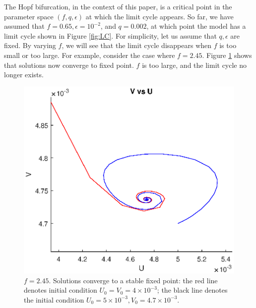 \documentclass[twocolumn,amsmath,amssymb,aps]{revtex4}
\begin{document}
The Hopf bifurcation, in the context of this paper, is a critical point in the parameter space $(f,q,\epsilon)$ at which the limit cycle appears. So far, we have assumed that $f = 0.65, \epsilon = 10^{-2}$, and $q = 0.002$, at which point the model has a limit cycle shown in Figure \ref{fig:LC}. For simplicity, let us assume that $q,\epsilon$ are fixed. By varying $f$, we will see that the limit cycle disappears when $f$ is too small or too large. For example, consider the case where $f=2.45$. Figure \ref{fig:hopf1} shows that solutions now converge to fixed point. $f$ is too large, and the limit cycle no longer exists.
\begin{figure}[!htb]
	\centering
	\includegraphics[scale=0.5]{hopf1.eps}
	\caption{$f = 2.45$. Solutions converge to a stable fixed point: the red line denotes initial condition $U_0 =V_0 = 4\times 10^{-3}$; the black line denotes the initial condition $U_0 = 5\times 10^{-3}, V_0 = 4.7 \times 10^{-3}$.}
	\label{fig:hopf1}
\end{figure}
\end{document}
